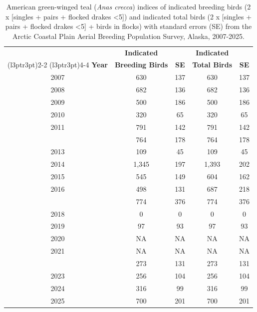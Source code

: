 \documentclass[
]{article}
\begin{document}
\begin{longtable}[t]{ccccc}

\caption{\label{tbl-GWTE}American green-winged teal (\emph{Anas crecca})
indices of indicated breeding birds (2 x {[}singles + pairs + flocked
drakes \textless5{]}) and indicated total birds (2 x {[}singles + pairs
+ flocked drakes \textless5{]} + birds in flocks) with standard errors
(SE) from the Arctic Coastal Plain Aerial Breeding Population Survey,
Alaska, 2007-2025.}

\tabularnewline

\\
\toprule
\multicolumn{1}{c}{\textbf{ }} & \multicolumn{1}{c}{\textbf{Indicated}} & \multicolumn{1}{c}{\textbf{ }} & \multicolumn{1}{c}{\textbf{Indicated}} & \multicolumn{1}{c}{\textbf{ }} \\
\cmidrule(l{3pt}r{3pt}){2-2} \cmidrule(l{3pt}r{3pt}){4-4}
\textbf{Year} & \textbf{Breeding Birds} & \textbf{SE} & \textbf{Total Birds} & \textbf{SE}\\
\midrule
2007 & 630 & 137 & 630 & 137\\
2008 & 682 & 136 & 682 & 136\\
2009 & 500 & 186 & 500 & 186\\
2010 & 320 & 65 & 320 & 65\\
2011 & 791 & 142 & 791 & 142\\
\addlinespace
2012 & 764 & 178 & 764 & 178\\
2013 & 109 & 45 & 109 & 45\\
2014 & 1,345 & 197 & 1,393 & 202\\
2015 & 545 & 149 & 604 & 162\\
2016 & 498 & 131 & 687 & 218\\
\addlinespace
2017 & 774 & 376 & 774 & 376\\
2018 & 0 & 0 & 0 & 0\\
2019 & 97 & 93 & 97 & 93\\
2020 & NA & NA & NA & NA\\
2021 & NA & NA & NA & NA\\
\addlinespace
2022 & 273 & 131 & 273 & 131\\
2023 & 256 & 104 & 256 & 104\\
2024 & 316 & 99 & 316 & 99\\
2025 & 700 & 201 & 700 & 201\\
\bottomrule

\end{longtable}

\endgroup{}
\end{document}

